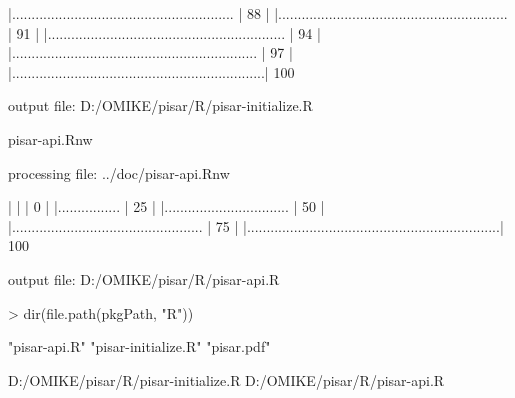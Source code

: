 \documentclass[a4paper,12pt]{article}\usepackage[]{graphicx}\usepackage[]{color}
\begin{document}
\begin{Schunk}
\begin{Soutput}
  |.........................................................        |  88%
  |                                                                       
  |...........................................................      |  91%
  |                                                                       
  |.............................................................    |  94%
  |                                                                       
  |...............................................................  |  97%
  |                                                                       
  |.................................................................| 100%
\end{Soutput}
\begin{Soutput}
output file: D:/OMIKE/pisar/R/pisar-initialize.R
\end{Soutput}
\begin{Soutput}
pisar-api.Rnw 
\end{Soutput}
\begin{Soutput}


processing file: ../doc/pisar-api.Rnw
\end{Soutput}
\begin{Soutput}

  |                                                                       
  |                                                                 |   0%
  |                                                                       
  |................                                                 |  25%
  |                                                                       
  |................................                                 |  50%
  |                                                                       
  |.................................................                |  75%
  |                                                                       
  |.................................................................| 100%
\end{Soutput}
\begin{Soutput}
output file: D:/OMIKE/pisar/R/pisar-api.R
\end{Soutput}
\begin{Sinput}
> dir(file.path(pkgPath, "R"))
\end{Sinput}
\begin{Soutput}
[1] "pisar-api.R"        "pisar-initialize.R" "pisar.pdf"         
\end{Soutput}
\end{Schunk}
 D:/OMIKE/pisar/R/pisar-initialize.R D:/OMIKE/pisar/R/pisar-api.R
\end{document}
